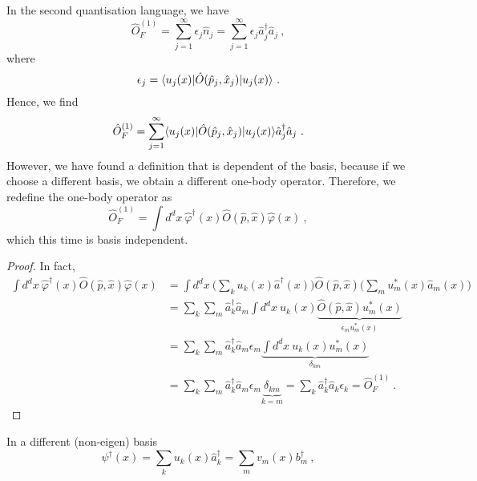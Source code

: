     In the second quantisation language, we have 
    \begin{equation}\label{onebody}
        \hat O^{(1)}_F = \sum_{j=1}^{\infty} \epsilon_j \hat n_j = \sum_{j=1}^{\infty} \epsilon_j \hat a_j^\dagger \hat a_j ~,
    \end{equation}
    where 
    \begin{equation*}
        \epsilon_j = \langle u_j (x)\vert \hat O (\hat p_j, \hat x_j) \vert u_j(x)\rangle ~.
    \end{equation*}
    Hence, we find
    \begin{equation*}
        \hat O^{(1)}_F = \sum_{j=1}^{\infty} \langle u_j (x)\vert \hat O (\hat p_j, \hat x_j) \vert u_j(x)\rangle \hat a_j^\dagger \hat a_j ~.
    \end{equation*}
    However, we have found a definition that is dependent of the basis, because if we choose a different basis, we obtain a different one-body operator. Therefore, we redefine the one-body operator as
    \begin{equation}\label{basind}
        \hat O^{(1)}_F = \int d^d x ~ \hat \varphi^\dagger (x) \hat O (\hat p, \hat x) \hat \varphi (x) ~,
    \end{equation}
    which this time is basis independent.
    \begin{proof}
        In fact,
        \begin{equation*}
        \begin{aligned}
            \int d^d x ~ \hat \varphi^\dagger (x) \hat O (\hat p, \hat x) \hat \varphi (x) & = \int d^d x ~ \Big ( \sum_k u_k(x) \hat a^\dagger (x) \Big ) \hat O (\hat p, \hat x) \Big ( \sum_m u_m^* (x) \hat a_m (x) \Big ) \\ & = \sum_k \sum_m \hat a_k^\dagger \hat a_m \int d^d x ~ u_k (x) \underbrace{\hat O(\hat p, \hat x) u^*_m (x)}_{\epsilon_m u^*_m (x)} \\ & = \sum_k \sum_m \hat a_k^\dagger \hat a_m \epsilon_m \underbrace{\int d^d x ~ u_k (x) u^*_m (x)}_{\delta_{km}} \\ & = \sum_k \sum_m \hat a_k^\dagger \hat a_m \epsilon_m \underbrace{\delta_{km}}_{k = m} = \sum_k\hat a_k^\dagger \hat a_k \epsilon_k = \hat O^{(1)}_F ~.
        \end{aligned}
        \end{equation*}
    \end{proof}
    In a different (non-eigen) basis
    \begin{equation*}
        \psi^\dagger (x) = \sum_k u_k (x) \hat a^\dagger_k = \sum_m v_m (x) b^\dagger_m ~,
    \end{equation*}
